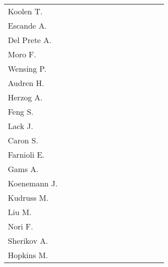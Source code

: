 \begin{table*}[t]
\begin{tabular}{|l|c|c|c|c|c|c|c|c|c|c|c|c|c|}
		Koolen T.			&
		& & & & & & & & & \cite{Koolen_Humanoids2013} & & & \cite{Koolen_IJHR2016}	\\
		Escande A.		&
		& & & & & & & & & \cite{Escande_RobAutoSys2013} & & & \\
		Del Prete A.	&
		& & & & & & & & & \cite{DelPrete_PhDThesis2013}	& \cite{DelPrete_IROS2014}
		& \cite{DelPrete_RSS2015} \cite{DelPrete_RobAutoSys2015}	& \\
		Moro F.					&
		& & & & & & & & & \cite{Moro_Humanoids2013} & & \cite{Moro_Humanoids2015} & \cite{Moro_IJHR2016}	\\
		Wensing P.			&
		& & & & & & & & & \cite{Wensing_ICRA2013} \cite{Wensing_IJHR2013}	& & & \cite{Wensing_IJHR2016}	\\
		Audren H.			&
		& & & & & & & & & & \cite{Audren_IROS2014}	& & \\
		Herzog A.			&
		& & & & & & & & & & \cite{Herzog_IROS2014} & \cite{Herzog_Humanoids2015}
		& \cite{Herzog_AutoRobots2016}	\\
		Feng S.				&
		& & & & & & & & & & \cite{Feng_Humanoids2014}	& & \\
		Lack J.				&
		& & & & & & & & & & \cite{Lack_ICRA2014}	& & \\
		Caron S.			&
		& & & & & & & & & & & \cite{Caron_RSS2015}	& \\
		Farnioli E.		&
		& & & & & & & & & & & \cite{Farnioli_ICRA2015}	& \\
		Gams A.				&
		& & & & & & & & & & & \cite{Gams_Robotica2015}	& \\
		Koenemann J.	&
		& & & & & & & & & & & \cite{Koenemann_IROS2015}	& \\
		Kudruss M.		&
		& & & & & & & & & & & \cite{Kudruss_Humanoids2015}	& \\
		Liu M.				&
		& & & & & & & & & & & \cite{LiuM_IROS2015}	& \\
		Nori F.				&
		& & & & & & & & & & & \cite{Nori_FrontRobAI2015}	& \\
		Sherikov A.		&
		& & & & & & & & & & & \cite{Sherikov_Humanoids2015}	& \\
		Hopkins M.			&
		& & & & & & & & & & & \cite{Hopkins_ICRA2015}	& \cite{Hopkins_IJHR2016}	\\
		\hline
	\end{tabular}
\end{table*}
